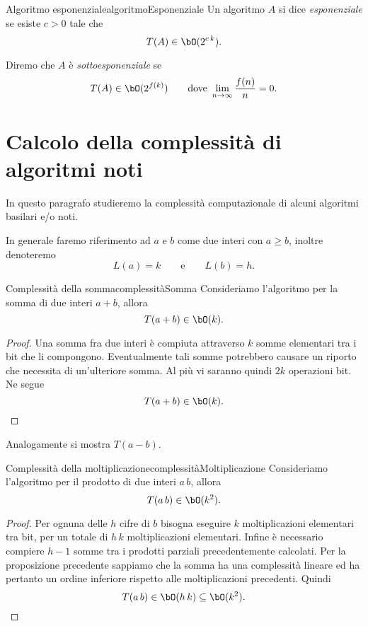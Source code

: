 	\begin{defn}{Algoritmo esponenziale}{algoritmoEsponenziale}
	Un algoritmo \(A\) si dice \emph{esponenziale} se esiste \(c>0\) tale che
		\[
		T(A) \in \bO(2^{c\,k}).
		\]
	\end{defn}

	\begin{notz}
	Diremo che \(A\) è \emph{sottoesponenziale} se
		\[
		T(A) \in \bO(2^{f(k)}) \qquad\text{dove } \lim_{n \to \infty} \frac{f(n)}{n} = 0.
		\]
	\end{notz}
\section{Calcolo della complessità di algoritmi noti}

	In questo paragrafo studieremo la complessità computazionale di alcuni algoritmi basilari e/o noti.

	In generale faremo riferimento ad \(a\) e \(b\) come due interi con \(a \ge b\), inoltre denoteremo
		\[
		L(a) = k \qquad\text{e}\qquad L(b) = h.
		\]

	\begin{prop}{Complessità della somma}{complessitàSomma}
	Consideriamo l'algoritmo per la somma di due interi \(a+b\), allora
		\[
		T(a+b) \in \bO(k).
		\]
	\end{prop}

	\begin{proof}
	Una somma fra due interi è compiuta attraverso \(k\) somme elementari tra i bit che li compongono.
	Eventualmente tali somme potrebbero causare un riporto che necessita di un'ulteriore somma.
	Al più vi saranno quindi \(2k\) operazioni bit. Ne segue
		\[
		T(a+b) \in \bO(k).\qedhere
		\]
	\end{proof}

	\begin{oss}
	Analogamente si mostra \(T(a-b)\).
	\end{oss}

	\begin{prop}{Complessità della moltiplicazione}{complessitàMoltiplicazione}
	Consideriamo l'algoritmo per il prodotto di due interi \(a\,b\), allora
		\[
		T(a\,b) \in \bO(k^2).
		\]
	\end{prop}

	\begin{proof}
	Per ognuna delle \(h\) cifre di \(b\) bisogna eseguire \(k\) moltiplicazioni elementari tra bit, per un totale di \(h\,k\) moltiplicazioni elementari.
	Infine è necessario compiere \(h-1\) somme tra i prodotti parziali precedentemente calcolati.
	Per la proposizione precedente sappiamo che la somma ha una complessità lineare ed ha pertanto un ordine inferiore rispetto alle moltiplicazioni precedenti. Quindi
		\[
		T(a\,b) \in \bO(h\,k) \subseteq \bO(k^2).\qedhere
		\]
	\end{proof}

